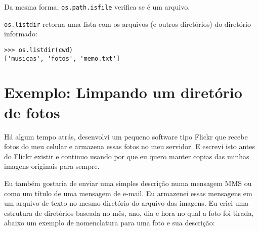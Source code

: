 Da mesma forma, {\tt os.path.isfile} verifica se é um arquivo.

{\tt os.listdir} retorna uma lista com os arquivos (e outros diretórios) do diretório informado:

\beforeverb
\begin{verbatim}
>>> os.listdir(cwd)
['musicas', 'fotos', 'memo.txt']
\end{verbatim}
\afterverb

\section{Exemplo: Limpando um diretório de fotos}

Há algum tempo atrás, desenvolvi um pequeno software tipo Flickr que recebe fotos do meu celular e armazena essas fotos no meu servidor. E escrevi isto antes do Flickr existir e continuo usando por que eu quero manter copias das minhas imagens originais para sempre.

Eu também gostaria de enviar uma simples descrição numa mensagem MMS ou como um título de uma mensagem de e-mail. Eu armazenei essas mensagens em um arquivo de texto no mesmo diretório do arquivo das imagens. Eu criei uma estrutura de diretórios baseada no mês, ano, dia e hora no qual a foto foi tirada, abaixo um exemplo de nomenclatura para uma foto e sua descrição:

